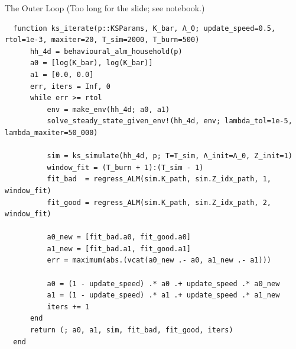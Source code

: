 \documentclass[10pt,aspectratio=169]{beamer}
\begin{document}
\begin{frame}[fragile]{The Outer Loop}
  (Too long for the slide; see notebook.)
  
  \begin{lstlisting}
  function ks_iterate(p::KSParams, K_bar, Λ_0; update_speed=0.5, rtol=1e-3, maxiter=20, T_sim=2000, T_burn=500)
      hh_4d = behavioural_alm_household(p)
      a0 = [log(K_bar), log(K_bar)]
      a1 = [0.0, 0.0]
      err, iters = Inf, 0
      while err >= rtol
          env = make_env(hh_4d; a0, a1)
          solve_steady_state_given_env!(hh_4d, env; lambda_tol=1e-5, lambda_maxiter=50_000)

          sim = ks_simulate(hh_4d, p; T=T_sim, Λ_init=Λ_0, Z_init=1)
          window_fit = (T_burn + 1):(T_sim - 1)
          fit_bad  = regress_ALM(sim.K_path, sim.Z_idx_path, 1, window_fit)
          fit_good = regress_ALM(sim.K_path, sim.Z_idx_path, 2, window_fit)

          a0_new = [fit_bad.a0, fit_good.a0]
          a1_new = [fit_bad.a1, fit_good.a1]
          err = maximum(abs.(vcat(a0_new .- a0, a1_new .- a1)))

          a0 = (1 - update_speed) .* a0 .+ update_speed .* a0_new
          a1 = (1 - update_speed) .* a1 .+ update_speed .* a1_new
          iters += 1
      end
      return (; a0, a1, sim, fit_bad, fit_good, iters)
  end
  \end{lstlisting}
\end{frame}
\end{document}
